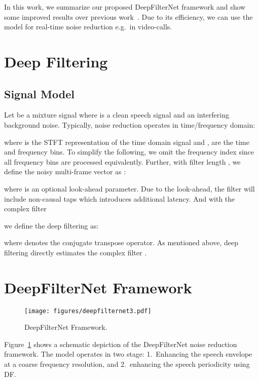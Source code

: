 \documentclass{INTERSPEECH2023}
\begin{document}
In this work, we summarize our proposed DeepFilterNet framework and show some improved results over previous work~\cite{schroeter2022deepfilternet2}.
Due to its efficiency, we can use the model for real-time noise reduction e.g.~in video-calls.

\section{Deep Filtering}
\vspace{-.2em}
\label{sec:df}
\subsection{Signal Model}
\vspace{-.2em}
\label{ssec:signalmodel}
Let  be a mixture signal
\vspace{-.25em}
where  is a clean speech signal and  an interfering background noise.
Typically, noise reduction operates in time/frequency domain:

where  is the STFT representation of the time domain signal  and ,  are the time and frequency bins.
To simplify the following, we omit the frequency index  since all frequency bins are processed equivalently.
Further, with filter length , we define the noisy multi-frame vector as :

where  is an optional look-ahead parameter.
Due to the look-ahead, the filter will include non-causal taps which introduces additional latency.
And with the complex filter 

we define the deep filtering as:

where  denotes the conjugate transpose operator.
As mentioned above, deep filtering directly estimates the complex filter .
\vspace{-.4em}

\section{DeepFilterNet Framework}
\vspace{-.2em}
\label{sec:framework}
\begin{figure}
  \texttt{[image: figures/deepfilternet3.pdf]}
  \caption{DeepFilterNet Framework.}
  \label{fig:DeepFilterNet}
  \vspace{-.7em}
\end{figure}

Figure~\ref{fig:DeepFilterNet} shows a schematic depiction of the DeepFilterNet noise reduction framework.
The model operates in two stage: 1.~Enhancing the speech envelope at a coarse frequency resolution, and 2.~enhancing the speech periodicity using DF.
\end{document}
